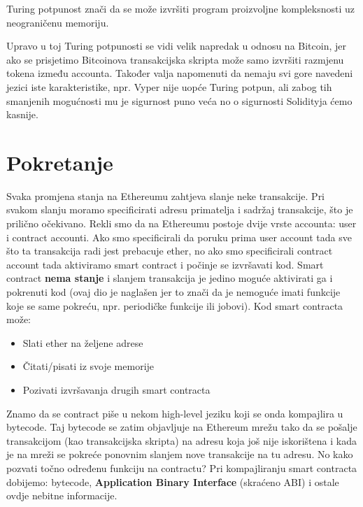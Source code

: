 \documentclass[12pt]{report}
\begin{document}
\begin{napomena}
Turing potpunost znači da se može izvršiti program proizvoljne kompleksnosti uz neograničenu memoriju.
\end{napomena}

Upravo u toj Turing potpunosti se vidi velik napredak u odnosu na Bitcoin, jer ako se prisjetimo Bitcoinova transakcijska skripta može samo izvršiti razmjenu tokena između accounta. Također valja napomenuti da nemaju svi gore navedeni jezici iste karakteristike, npr. Vyper nije uopće Turing potpun, ali zabog tih smanjenih mogućnosti mu je sigurnost puno veća no o sigurnosti Solidityja ćemo kasnije.

\section{Pokretanje}

Svaka promjena stanja na Ethereumu zahtjeva slanje neke transakcije. Pri svakom slanju moramo specificirati adresu primatelja i sadržaj transakcije, što je prilično očekivano. Rekli smo da na Ethereumu postoje dvije vrste accounta: user i contract accounti. Ako smo specificirali da poruku prima user account tada sve što ta transakcija radi jest prebacuje ether, no ako smo specificirali contract account tada aktiviramo smart contract i počinje se izvršavati kod. Smart contract \textbf{nema stanje} i slanjem transakcija je jedino moguće aktivirati ga i pokrenuti kod (ovaj dio je naglašen jer to znači da je nemoguće imati funkcije koje se same pokreću, npr. periodičke funkcije ili jobovi). Kod smart contracta može:

\begin{itemize}
    \item Slati ether na željene adrese
    \item Čitati/pisati iz svoje memorije
    \item Pozivati izvršavanja drugih smart contracta
\end{itemize}

Znamo da se contract piše u nekom high-level jeziku koji se onda kompajlira u bytecode. Taj bytecode se zatim objavljuje na Ethereum mrežu tako da se pošalje transakcijom (kao transakcijska skripta) na adresu koja još nije iskorištena i kada je na mreži se pokreće ponovnim slanjem nove transakcije na tu adresu. No kako pozvati točno određenu funkciju na contractu? Pri kompajliranju smart contracta dobijemo: bytecode,  \textbf{Application Binary Interface} (skraćeno ABI) i ostale ovdje nebitne informacije.
\end{document}
